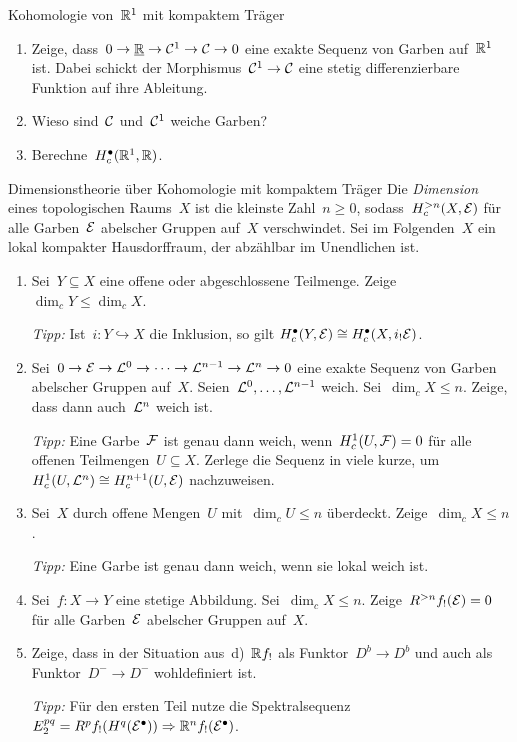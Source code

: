 \documentclass{uebblatt}
\begin{document}

\begin{aufgabe}{Kohomologie von~$\mathbb{R}^1$ mit kompaktem Träger}
\begin{enumerate}
\item Zeige, dass~$0 \to \underline{\mathbb{R}} \to \mathcal{C}^1 \to
\mathcal{C} \to 0$ eine exakte Sequenz von Garben auf~$\mathbb{R}^1$ ist. Dabei schickt der Morphismus~$\mathcal{C}^1
\to \mathcal{C}$ eine stetig differenzierbare Funktion auf ihre Ableitung.
\item Wieso sind~$\mathcal{C}$ und~$\mathcal{C}^1$ weiche Garben?
\item Berechne~$H^\bullet_c(\mathbb{R}^1, \mathbb{R})$.
\end{enumerate}
\end{aufgabe}

\begin{aufgabe}{Dimensionstheorie über Kohomologie mit kompaktem Träger}
Die \emph{Dimension} eines topologischen Raums~$X$ ist die kleinste Zahl~$n
\geq 0$, sodass~$H_c^{> n}(X,\mathcal{E})$ für alle Garben~$\mathcal{E}$ abelscher Gruppen
auf~$X$ verschwindet. Sei im Folgenden~$X$ ein lokal kompakter Hausdorffraum,
der abzählbar im Unendlichen ist.
\begin{enumerate}
\item Sei~$Y \subseteq X$ eine offene oder abgeschlossene Teilmenge.
Zeige~$\dim_c Y \leq \dim_c X$.

{\tiny\emph{Tipp:} Ist~$i : Y \hookrightarrow X$ die Inklusion, so gilt
$H_c^\bullet(Y,\mathcal{E}) \cong H_c^\bullet(X,i_! \mathcal{E})$.\par}
\item Sei~$0 \to \mathcal{E} \to \mathcal{L}^0 \to \cdots \to \mathcal{L}^{n-1} \to \mathcal{L}^n \to 0$ eine
exakte Sequenz von Garben abelscher Gruppen auf~$X$.
Seien~$\mathcal{L}^0,\ldots,\mathcal{L}^{n-1}$ weich. Sei~$\dim_c X \leq n$. Zeige, dass dann
auch~$\mathcal{L}^n$ weich ist.

{\tiny\emph{Tipp:} Eine Garbe~$\mathcal{F}$ ist genau dann weich, wenn~$H^1_c(U,\mathcal{F}) = 0$
für alle offenen Teilmengen~$U \subseteq X$. Zerlege die Sequenz in viele
kurze, um~$H^1_c(U,\mathcal{L}^n) \cong H^{n+1}_c(U,\mathcal{E})$ nachzuweisen.\par}
\item Sei~$X$ durch offene Mengen~$U$ mit~$\dim_c U \leq
n$ überdeckt. Zeige~$\dim_c X \leq n$.

{\tiny\emph{Tipp:} Eine Garbe ist genau dann weich, wenn sie lokal weich
ist.\par}
\item Sei~$f : X \to Y$ eine stetige Abbildung. Sei~$\dim_c X \leq n$.
Zeige~$R^{> n} f_!(\mathcal{E}) = 0$ für alle Garben~$\mathcal{E}$ abelscher Gruppen auf~$X$.
\item Zeige, dass in der Situation aus~d)~$\mathbb{R} f_!$ als Funktor~$D^b \to D^b$ und
auch als Funktor~$D^- \to D^-$ wohldefiniert ist.

{\tiny\emph{Tipp:} Für den ersten Teil nutze die Spektralsequenz~$E_2^{pq} =
R^p f_! (H^q(\mathcal{E}^\bullet)) \Rightarrow \mathbb{R}^n f_!(\mathcal{E}^\bullet)$.\par}
\end{enumerate}
\end{aufgabe}
\end{document}
